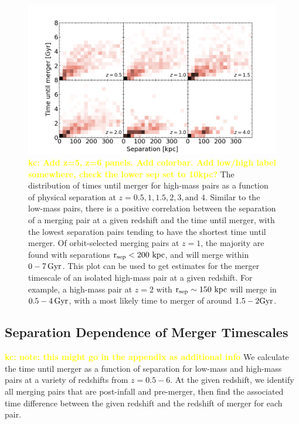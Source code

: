 \documentclass[twocolumn,linenumbers]{aastex631}
\newcommand{\kc}[1]{\textcolor{yellow}{\textbf{kc: #1}} }
\newcommand{\rsep}{\ensuremath{\rm r_{sep}}}
\begin{document}
\begin{figure}[htb]
    \begin{center}
    \includegraphics[width=\textwidth]{plots/bet-on-it/3_Timevssephigh-2d.png}
    \caption{\kc{Add z=5, z=6 panels. Add colorbar. Add low/high label somewhere, check the lower sep set to 10kpc?} The distribution of times until merger for high-mass pairs as a function of physical separation at $z=0.5,1,1.5,2,3,\mbox{and }4$.
    Similar to the low-mass pairs, there is a positive correlation between the separation of a merging pair at a given redshift and the time until merger, with the lowest separation pairs tending to have the shortest time until merger.
    Of orbit-selected merging pairs at $z=1$, the majority are found with separations $\rsep<200\,\kpc$, and will merge within $0-7\, \mathrm{Gyr}$. 
    This plot can be used to get estimates for the merger timescale of an isolated high-mass pair at a given redshift. 
    For example, a high-mass pair at $z=2$ with $\rsep\sim 150\,\kpc$ will merge in $0.5-4\,\mathrm{Gyr}$, with a most likely time to merger of around $1.5-2\mathrm{Gyr}$.
    }
    \label{fig:timevssep-high}
    \end{center}
\end{figure}

\subsection{Separation Dependence of Merger Timescales}\label{sec:results-timevsep}
\kc{note: this might go in the appendix as additional info}
We calculate the time until merger as a function of separation for low-mass and high-mass pairs at a variety of redshifts from $z=0.5-6$. 
At the given redshift, we identify all merging pairs that are post-infall and pre-merger, then find the associated time difference between the given redshift and the redshift of merger for each pair.
\end{document}
